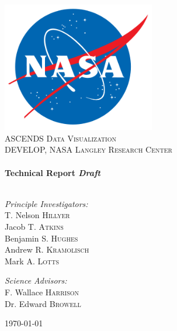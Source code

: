 \begin{titlepage}

\begin{center}

\includegraphics[width=0.5\textwidth]{./resources/logo}\\[1cm]

\textsc{\Huge ASCENDS Data Visualization}\\[1.5cm]

\textsc{\Large DEVELOP, NASA Langley Research Center}\\[0.5cm]

\HRule \\[0.4cm]
{ \huge \bfseries Technical Report \emph{Draft}}\\[0.4cm]

\HRule \\[1.5cm]

\begin{minipage}{0.45\textwidth}
\begin{flushleft} \large
\emph{Principle Investigators:}\\
T. Nelson \textsc{Hillyer}\\
Jacob T. \textsc{Atkins}\\
Benjamin S. \textsc{Hughes}\\
Andrew R. \textsc{Kramolisch}\\
Mark A. \textsc{Lotts}
\end{flushleft}
\end{minipage}
\begin{minipage}{0.45\textwidth}
\begin{flushright} \large
\emph{Science Advisors:}\\
F. Wallace \textsc{Harrison}\\
Dr. Edward \textsc{Browell}
\end{flushright}
\end{minipage}

\vfill

{\large \today}

\end{center}

\end{titlepage}

